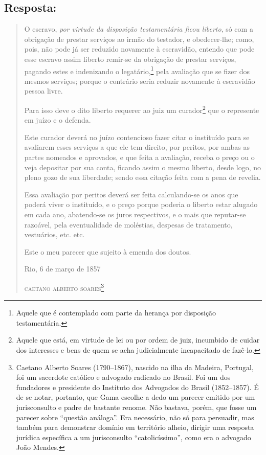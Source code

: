 {\subsection{Resposta:}

\begin{quote}
O escravo, \emph{por virtude da disposição testamentária ficou
liberto}, só com a obrigação de prestar serviços ao irmão do testador, e
obedecer-lhe; como, pois, não pode já ser reduzido novamente à
escravidão, entendo que pode esse escravo assim liberto remir-se da
obrigação de prestar serviços, pagando estes e indenizando o
legatário,\footnote{ Aquele que é contemplado com
  parte da herança por disposição testamentária.} pela avaliação que se
fizer dos mesmos serviços; porque o contrário seria reduzir novamente à
escravidão pessoa livre.

Para isso deve o dito liberto requerer ao juiz um curador\footnote{
  Aquele que está, em virtude de lei ou por ordem de juiz, incumbido de
  cuidar dos interesses e bens de quem se acha judicialmente
  incapacitado de fazê-lo.} que o represente em juízo e o defenda.

Este curador deverá no juízo contencioso fazer citar o instituído para
se avaliarem esses serviços a que ele tem direito, por peritos, por
ambas as partes nomeados e aprovados, e que feita a avaliação, receba o
preço ou o veja depositar por sua conta, ficando assim o mesmo liberto,
desde logo, no pleno gozo de sua liberdade; sendo essa citação feita com
a pena de revelia.

Essa avaliação por peritos deverá ser feita calculando-se os anos que
poderá viver o instituído, e o preço porque poderia o liberto estar
alugado em cada ano, abatendo-se os juros respectivos, e o mais que
reputar-se razoável, pela eventualidade de moléstias, despesas de
tratamento, vestuários, etc. etc.

Este o meu parecer que sujeito à emenda dos doutos.

\begin{flushright}
Rio, 6 de março de 1857

\textsc{caetano alberto soares}\footnote{ Caetano Alberto Soares
  (1790--1867), nascido na ilha da Madeira, Portugal, foi um sacerdote
  católico e advogado radicado no Brasil. Foi um dos fundadores e
  presidente do Instituto dos Advogados do Brasil (1852--1857). É de se
  notar, portanto, que Gama escolhe a dedo um parecer emitido por um
  jurisconsulto e padre de bastante renome. Não bastava, porém, que
  fosse um parecer sobre ``questão análoga''. Era necessário, não só
  para persuadir, mas também para demonstrar domínio em território
  alheio, dirigir uma resposta jurídica específica a um jurisconsulto
  ``catolicíssimo'', como era o advogado João Mendes.}
\end{flushright}


\end{quote}}
